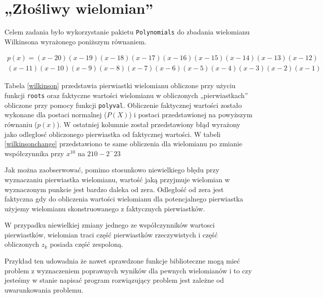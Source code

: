 \documentclass{article}
\begin{document}
\section{„Złośliwy wielomian”}

Celem zadania było wykorzystanie pakietu \texttt{Polynomials} do zbadania wielomianu Wilkinsona wyrażonego poniższym równaniem.

\begin{equation*}
  \begin{multlined}
p(x)=(x-20)(x-19)(x-18)(x-17)(x-16)(x-15)(x-14)(x-13)(x-12)\\(x-11)(x-10)(x-9)(x-8)(x-7)(x-6)(x-5)(x-4)(x-3)(x-2)(x-1)
 \end{multlined}
\end{equation*}

Tabela \ref{wilkinson} przedstawia pierwiastki wielomianu obliczone przy użyciu funkcji \texttt{roots} oraz faktyczne wartości wielomianu w obliczonych „pierwiastkach” obliczone przy pomocy funkcji \texttt{polyval}.
Obliczenie faktycznej wartości zostało wykonane dla postaci normalnej ($P(X)$) i postaci przedstawionej na powyższym równaniu ($p(x)$).
W ostatniej kolumnie został przedstawiony błąd wyrażony jako odległosć obliczonego pierwiastka od faktycznej wartości.
W tabeli \ref{wilkinsonchange} przedstawiono te same obliczenia dla wielomianu po zmianie współczynnika przy $x^{10}$ na $210-2^-23$

Jak można zaobserwować, pomimo stosunkowo niewielkiego błędu przy wyznaczaniu pierwiastka wielomianu, wartość jaką przyjmuje wielomian w wyznaczonym punkcie jest bardzo daleka od zera.
Odległość od zera jest faktyczna gdy do obliczenia wartości wielomianu dla potencjalnego pierwiastka użyjemy wielomianu skonstruowanego z faktycznych pierwiastków.

W przypadku niewielkiej zmiany jednego ze współczynników wartosci pierwiastków, wielomian traci część pierwiastków rzeczywistych i część obliczonych $z_k$ posiada część zespoloną.

Przykład ten udowadnia że nawet sprawdzone funkcje biblioteczne mogą mieć problem z wyznaczeniem poprawnych wyników dla pewnych wielomianów i to czy jesteśmy w stanie napisać program rozwiązujący problem jest zależne od uwarunkowania problemu.
\end{document}
